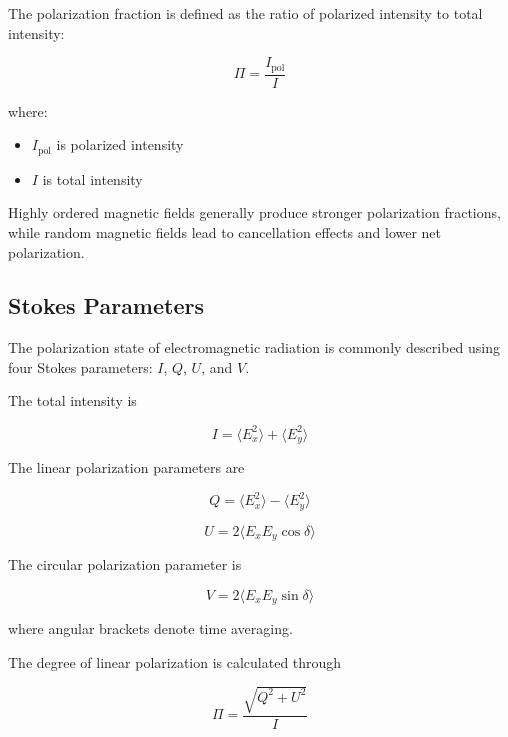 \documentclass{article}
\begin{document}
The polarization fraction is defined as the ratio of polarized intensity to total intensity:

\begin{equation}
\Pi = \frac{I_{\mathrm{pol}}}{I}
\end{equation}

where:
\begin{itemize}
    \item \(I_{\mathrm{pol}}\) is polarized intensity
    \item \(I\) is total intensity
\end{itemize}

Highly ordered magnetic fields generally produce stronger polarization fractions, while random magnetic fields lead to cancellation effects and lower net polarization.

\subsection{Stokes Parameters}

The polarization state of electromagnetic radiation is commonly described using four Stokes parameters: \(I\), \(Q\), \(U\), and \(V\).

The total intensity is

\begin{equation}
I = \langle E_x^2 \rangle + \langle E_y^2 \rangle
\end{equation}

The linear polarization parameters are

\begin{equation}
Q = \langle E_x^2 \rangle - \langle E_y^2 \rangle
\end{equation}

\begin{equation}
U = 2\langle E_xE_y\cos\delta \rangle
\end{equation}

The circular polarization parameter is

\begin{equation}
V = 2\langle E_xE_y\sin\delta \rangle
\end{equation}

where angular brackets denote time averaging.

The degree of linear polarization is calculated through

\begin{equation}
\Pi =
\frac{\sqrt{Q^2+U^2}}{I}
\end{equation}
\end{document}
